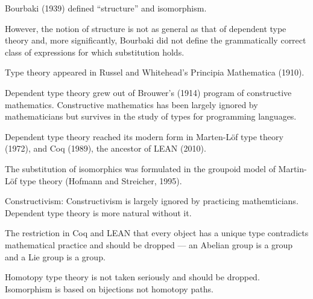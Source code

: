 
Bourbaki (1939) defined ``structure'' and isomorphism.

\vfill
However, the notion of structure is not as general as that of dependent type theory and,
more significantly, Bourbaki did not define the grammatically correct class of expressions for which substitution holds.


Type theory appeared in Russel and Whitehead's Principia Mathematica (1910).

\vfill
Dependent type theory grew out of Brouwer's (1914) program of constructive mathematics.
Constructive mathematics has been largely ignored by mathematicians
but survives in the study of types for programming languages.

\vfill
Dependent type theory reached its modern form in Marten-L\"{o}f type theory (1972),
and Coq (1989), the ancestor of LEAN (2010).

\vfill
The substitution of isomorphics was formulated in the groupoid model of Martin-L\"{o}f type theory (Hofmann and Streicher, 1995).


Constructivism: Constructivism is largely ignored by practicing mathemticians. Dependent type theory is more natural without it.

\vfill
The restriction in Coq and LEAN that every object has a unique type contradicts mathematical practice and should
be dropped --- an Abelian group is a group and a Lie group is a group.


\vfill
Homotopy type theory is not taken seriously and should be dropped.  Isomorphism is based on bijections not
homotopy paths.





